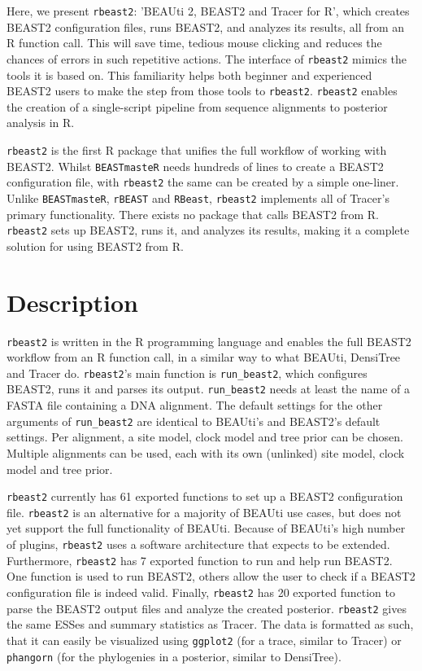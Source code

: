 \documentclass{article}
\begin{document}
Here, we present \verb;rbeast2;:
’BEAUti 2, BEAST2 and Tracer for R’, 
which creates BEAST2 configuration files,
runs BEAST2, and analyzes its results,
all from an R function call. This
will save time, tedious mouse clicking and 
reduces the chances of errors in such repetitive actions.
The interface of \verb;rbeast2; mimics the tools it
is based on. This
familiarity helps both beginner and experienced BEAST2 users 
to make the step from those tools to \verb;rbeast2;.
\verb;rbeast2; enables the creation of a single-script 
pipeline from sequence alignments to posterior analysis in R. 

\verb;rbeast2; is the first R package that unifies the
full workflow of working with BEAST2. 
Whilst \verb;BEASTmasteR; needs hundreds of lines to create
a BEAST2 configuration file, with \verb;rbeast2; the same 
can be created by a simple one-liner. Unlike \verb;BEASTmasteR;,
\verb;rBEAST; and \verb;RBeast;, \verb;rbeast2; implements all of Tracer's
primary functionality. There exists no package that calls BEAST2 from R.
\verb;rbeast2; sets up BEAST2, runs it, and analyzes its
results, making it a complete solution for using BEAST2 from R.

\section{Description}

\verb;rbeast2; is written in the R programming language \cite{R}
and enables the full BEAST2 workflow from an R function call,
in a similar way to what BEAUti, DensiTree and Tracer do.
\verb;rbeast2;'s main function is \verb;run_beast2;, which
configures BEAST2, runs it and parses its output. 
\verb;run_beast2; needs at least the name of a 
FASTA file containing a DNA alignment. 
The default settings for the other arguments of \verb;run_beast2; 
are identical to BEAUti's and BEAST2's default settings.
Per alignment, a site model, clock model and tree prior can be chosen.
Multiple alignments can be used, each with its own (unlinked) site model, 
clock model and tree prior.

\verb;rbeast2; currently has 61 exported functions to set up  
a BEAST2 configuration file. 
\verb;rbeast2; is an alternative for a majority of BEAUti use cases, 
but does not yet support the full functionality of BEAUti. 
Because of BEAUti's high number of plugins, 
\verb;rbeast2; uses a software architecture that expects to be extended.
Furthermore, \verb;rbeast2; has 7 exported function to run and help run BEAST2.
One function is used to run BEAST2, others
allow the user to check if a BEAST2 configuration file is indeed valid.
Finally, \verb;rbeast2; has 20 exported function to parse the BEAST2 output
files and analyze the created posterior. \verb;rbeast2; gives the
same ESSes and summary statistics as Tracer. The data is formatted
as such, that it can easily be visualized using \verb;ggplot2; (for a trace,
similar to Tracer) or \verb;phangorn; \cite{phangorn} (for 
the phylogenies in a posterior, similar to DensiTree). 
\end{document}
